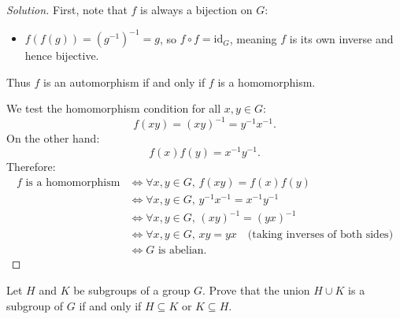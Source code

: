 \begin{proof}[Solution]
First, note that $f$ is always a bijection on $G$:
\begin{itemize}[leftmargin=1.5em, itemsep=2pt]
    \item $f(f(g)) = (g^{-1})^{-1} = g$, so $f \circ f = \text{id}_G$, meaning $f$ is its own inverse and hence bijective.
\end{itemize}
Thus $f$ is an automorphism if and only if $f$ is a homomorphism.

We test the homomorphism condition for all $x, y \in G$:
\begin{equation*}
f(xy) = (xy)^{-1} = y^{-1}x^{-1}.
\end{equation*}
On the other hand:
\begin{equation*}
f(x)f(y) = x^{-1}y^{-1}.
\end{equation*}
Therefore:
\begin{align*}
f \text{ is a homomorphism} 
&\iff \forall x, y \in G, \, f(xy) = f(x)f(y) \\
&\iff \forall x, y \in G, \, y^{-1}x^{-1} = x^{-1}y^{-1} \\
&\iff \forall x, y \in G, \, (xy)^{-1} = (yx)^{-1} \\
&\iff \forall x, y \in G, \, xy = yx \quad \text{(taking inverses of both sides)} \\
&\iff G \text{ is abelian}.
\end{align*}
\end{proof}

\begin{problem}
Let $H$ and $K$ be subgroups of a group $G$. Prove that the union $H \cup K$ is a subgroup of $G$ if and only if $H \subseteq K$ or $K \subseteq H$.
\end{problem}

